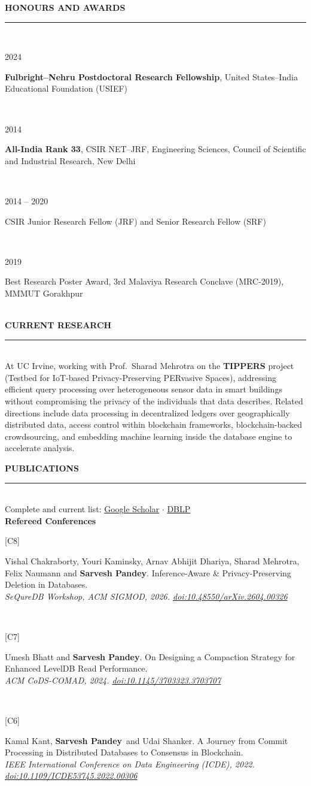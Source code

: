\documentclass[11pt,a4paper]{article}
\newcommand{\me}{\textbf{Sarvesh Pandey}}
\newcommand{\cvsection}[1]{%
  \vspace{1.05em}%
  {\normalsize\bfseries\uppercase{#1}}\\[-0.55em]%
  \rule{\textwidth}{0.6pt}\\[0.35em]%
}
\newcommand{\cvrow}[2]{%
  \begin{minipage}[t]{0.145\textwidth}\raggedright\small\textcolor{black!62}{#1}\end{minipage}%
  \hfill%
  \begin{minipage}[t]{0.835\textwidth}#2\end{minipage}\\[0.5em]%
}
\newcommand{\pub}[3]{%
  \begin{minipage}[t]{0.045\textwidth}\raggedright\small #1\end{minipage}%
  \begin{minipage}[t]{0.945\textwidth}#2\\{\small\itshape #3}\end{minipage}\\[0.34em]%
}
\begin{document}
\cvsection{Honours and Awards}

\cvrow{2024}{\textbf{Fulbright--Nehru Postdoctoral Research Fellowship}, United States--India Educational Foundation (USIEF)}
\cvrow{2014}{\textbf{All-India Rank 33}, CSIR NET--JRF, Engineering Sciences, Council of Scientific and Industrial Research, New Delhi}
\cvrow{2014 -- 2020}{CSIR Junior Research Fellow (JRF) and Senior Research Fellow (SRF)}
\cvrow{2019}{Best Research Poster Award, 3rd Malaviya Research Conclave (MRC-2019), MMMUT Gorakhpur}

\cvsection{Current Research}

At UC Irvine, working with Prof.\ Sharad Mehrotra on the \textbf{TIPPERS} project
(Testbed for IoT-based Privacy-Preserving PERvasive Spaces), addressing efficient
query processing over heterogeneous sensor data in smart buildings without
compromising the privacy of the individuals that data describes. Related directions
include data processing in decentralized ledgers over geographically distributed data,
access control within blockchain frameworks, blockchain-backed crowdsourcing, and
embedding machine learning inside the database engine to accelerate analysis.

\cvsection{Publications}

{\small Complete and current list:
\href{https://scholar.google.com/citations?user=eXeYCBgAAAAJ}{Google Scholar} $\cdot$
\href{https://dblp.org/pid/211/7543.html}{DBLP}}\\[0.7em]

\textbf{\small Refereed Conferences}\\[0.45em]

\pub{[C8]}{Vishal Chakraborty, Youri Kaminsky, Arnav Abhijit Dhariya, Sharad Mehrotra, Felix Naumann and \me. Inference-Aware \& Privacy-Preserving Deletion in Databases.}{SeQureDB Workshop, ACM SIGMOD, 2026. \href{https://doi.org/10.48550/arXiv.2604.00326}{doi:10.48550/arXiv.2604.00326}}

\pub{[C7]}{Umesh Bhatt and \me. On Designing a Compaction Strategy for Enhanced LevelDB Read Performance.}{ACM CoDS-COMAD, 2024. \href{https://doi.org/10.1145/3703323.3703707}{doi:10.1145/3703323.3703707}}

\pub{[C6]}{Kamal Kant, \me\ and Udai Shanker. A Journey from Commit Processing in Distributed Databases to Consensus in Blockchain.}{IEEE International Conference on Data Engineering (ICDE), 2022. \href{https://doi.org/10.1109/ICDE53745.2022.00306}{doi:10.1109/ICDE53745.2022.00306}}
\end{document}
